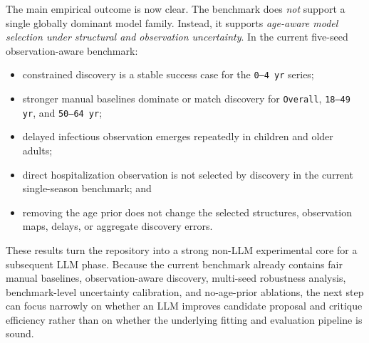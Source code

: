The main empirical outcome is now clear. The benchmark does \emph{not} support
a single globally dominant model family. Instead, it supports
\emph{age-aware model selection under structural and observation uncertainty}.
In the current five-seed observation-aware benchmark:
\begin{itemize}[leftmargin=1.5em]
\item constrained discovery is a stable success case for the \texttt{0--4 yr}
series;
\item stronger manual baselines dominate or match discovery for
\texttt{Overall}, \texttt{18--49 yr}, and \texttt{50--64 yr};
\item delayed infectious observation emerges repeatedly in children and older
adults;
\item direct hospitalization observation is not selected by discovery in the
current single-season benchmark; and
\item removing the age prior does not change the selected structures,
observation maps, delays, or aggregate discovery errors.
\end{itemize}

These results turn the repository into a strong non-LLM experimental core for a
subsequent LLM phase. Because the current benchmark already contains fair manual
baselines, observation-aware discovery, multi-seed robustness analysis,
benchmark-level uncertainty calibration, and no-age-prior ablations, the next
step can focus narrowly on whether an LLM improves candidate proposal and
critique efficiency rather than on whether the underlying fitting and
evaluation pipeline is sound.
